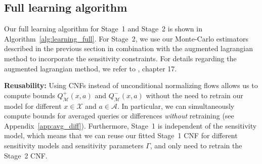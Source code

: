 \documentclass{article} %
\theoremstyle{definition}
\theoremstyle{plain}
\begin{document}
\subsection{Full learning algorithm}

Our full learning algorithm for Stage~1 and Stage~2 is shown in Algorithm~\ref{alg:learning_full}. For Stage~2, we use our Monte-Carlo estimators described in the previous section in combination with the augmented lagrangian method to incorporate the sensitivity constraints. For details regarding the augmented lagrangian method, we refer to \citet{Nocedal.2006}, chapter 17.

\textbf{Reusability:} Using CNFs instead of unconditional normalizing flows allows us to compute bounds $Q^+_\mathcal{M}(x, a)$ and $Q^-_\mathcal{M}(x, a)$ without the need to retrain our model for different $x \in \mathcal{X}$ and $a \in \mathcal{A}$. In particular, we can simultaneously compute bounds for averaged queries or differences \emph{without} retraining (see Appendix~\ref{app:avg_diff}). Furthermore, Stage~1 is independent of the sensitivity model, which means that we can reuse our fitted Stage~1 CNF for different sensitivity models and sensitivity parameters $\Gamma$, and only need to retrain the Stage~2 CNF. 
\end{document}
